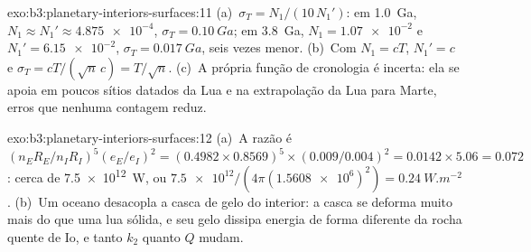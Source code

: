 \begin{solution}{exo:b3:planetary-interiors-surfaces:11}
(a)~$\sigma_T = N_1/(10\,N_1')$: em \qty{1.0}{Ga}, $N_1 \approx N_1' \approx
\num{4.875e-4}$, $\sigma_T = \qty{0.10}{Ga}$; em \qty{3.8}{Ga}, $N_1 =
\num{1.07e-2}$ e $N_1' = \num{6.15e-2}$, $\sigma_T = \qty{0.017}{Ga}$,
seis vezes menor. (b)~Com $N_1 = cT$, $N_1' = c$ e $\sigma_T =
cT/(\sqrt n\,c) = T/\sqrt n$. (c)~A própria função de cronologia é
incerta: ela se apoia em poucos sítios datados da Lua e na extrapolação
da Lua para Marte, erros que nenhuma contagem reduz.
\end{solution}

\begin{solution}{exo:b3:planetary-interiors-surfaces:12}
(a)~A razão é $(n_ER_E/n_IR_I)^5(e_E/e_I)^2 = (0.4982\times0.8569)^5
\times(0.009/0.004)^2 = 0.0142\times5.06 = 0.072$: cerca de
\qty{7.5e12}{W}, ou $\num{7.5e12}/(4\pi(\num{1.5608e6})^2) =
\qty{0.24}{W.m^{-2}}$. (b)~Um oceano desacopla a casca de gelo do
interior: a casca se deforma muito mais do que uma lua sólida, e seu gelo
dissipa energia de forma diferente da rocha quente de Io, e tanto $k_2$ quanto $Q$ mudam.
\end{solution}

